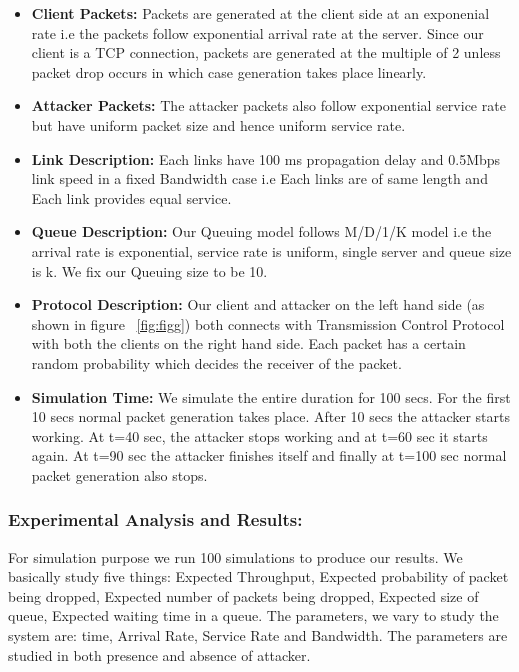 \begin{itemize}

\item \textbf{Client Packets:} Packets are generated at the client side at an exponenial rate i.e the packets follow exponential arrival rate at the server. Since our client is a TCP connection, packets are generated at the multiple of 2 unless packet drop occurs in which case generation takes place linearly.  

\item \textbf{Attacker Packets:} The attacker packets also follow exponential service rate but have uniform packet size and hence uniform service rate.

\item \textbf{Link Description:} Each links have 100 ms propagation delay and 0.5Mbps link speed in a fixed Bandwidth case i.e Each links are of same length and Each link provides equal service.

\item \textbf{Queue Description:} Our Queuing model follows M/D/1/K model i.e the arrival rate is exponential, service rate is uniform, single server and queue size is k. We fix our Queuing size to be 10.

\item \textbf{Protocol Description:} Our client and attacker on the left hand side (as shown in figure ~\ref{fig:figg}) both connects with Transmission Control Protocol with both the clients on the right hand side. Each packet has a certain random probability which decides the receiver of the packet.

\item \textbf{Simulation Time:} We simulate the entire duration for 100 secs. For the first 10 secs normal packet generation takes place. After 10 secs the attacker starts working. At t=40 sec, the attacker stops working and at t=60 sec it starts again. At t=90 sec the attacker finishes itself and finally at t=100 sec normal packet generation also stops.

\end{itemize}

\subsubsection{Experimental Analysis and Results:}
\medskip

For simulation purpose we run 100 simulations to produce our results. We basically study five things: Expected Throughput, Expected probability of packet being dropped, Expected number of packets being dropped, Expected size of queue, Expected waiting time in a queue. The parameters, we vary to study the system are: time, Arrival Rate, Service Rate and Bandwidth. The parameters are studied in both presence and absence of attacker. 
  
